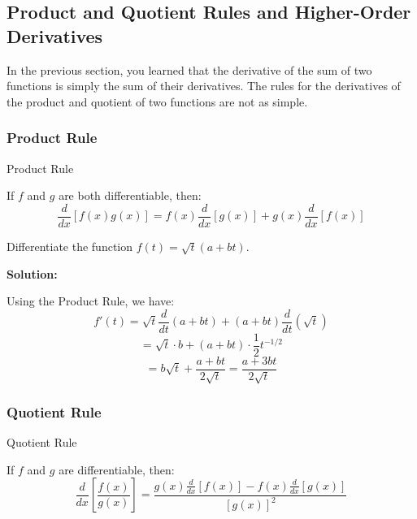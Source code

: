 \documentclass[12pt]{article}
\theoremstyle{beautifulthm}
\begin{document}
\newpage
\subsection{ Product and Quotient Rules and Higher-Order Derivatives}

In the previous section, you learned that the derivative of the sum of two functions is simply the sum of their derivatives. The rules for the derivatives of the product and quotient of two functions are not as simple.
\subsubsection{Product Rule}
\begin{mytheorem}{Product Rule}{}

If \( f \) and \( g \) are both differentiable, then:
\[
\frac{d}{dx} [f(x)g(x)] = f(x) \frac{d}{dx} [g(x)] + g(x) \frac{d}{dx} [f(x)]
\]
\end{mytheorem}

\begin{tcolorbox}[colback=examplebg, colframe=red!75!black, title=\textbf{EXAMPLE 1: Using the Product Rule}, fonttitle=\bfseries, sharp corners]
Differentiate the function \( f(t) = \sqrt{t} (a + bt) \).

\tcblower
\textbf{Solution:}

Using the Product Rule, we have:
\[
f'(t) = \sqrt{t} \frac{d}{dt} (a + bt) + (a + bt) \frac{d}{dt} (\sqrt{t})
\]
\[
= \sqrt{t} \cdot b + (a + bt) \cdot \frac{1}{2} t^{-1/2}
\]
\[
= b\sqrt{t} + \frac{a + bt}{2\sqrt{t}} = \frac{a + 3bt}{2\sqrt{t}}
\]

\end{tcolorbox}

\newpage

\subsubsection{Quotient Rule}
\begin{mytheorem}{Quotient Rule}{}

If \( f \) and \( g \) are differentiable, then:
\[
\frac{d}{dx} \left[ \frac{f(x)}{g(x)} \right] = \frac{g(x) \frac{d}{dx} [f(x)] - f(x) \frac{d}{dx} [g(x)]}{[g(x)]^2}
\]
\end{mytheorem}
\end{document}
